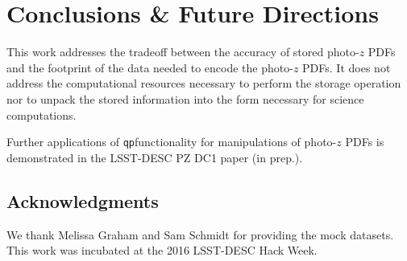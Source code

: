\documentclass[\docopts]{\docclass}
\newcommand{\qp}{\texttt{qp}}
\begin{document}

\section{Conclusions \& Future Directions}
\label{sec:conclusions}

%
%


This work addresses the tradeoff between the accuracy of stored photo-$z$ PDFs and the footprint of the data needed to encode the photo-$z$ PDFs.  It does not address the computational resources necessary to perform the storage operation nor to unpack the stored information into the form necessary for science computations.

Further applications of \qp functionality for manipulations of photo-$z$ PDFs is demonstrated in the LSST-DESC PZ DC1 paper (in prep.).

\subsection*{Acknowledgments}


We thank Melissa Graham and Sam Schmidt for providing the mock datasets.  This work was incubated at the 2016 LSST-DESC Hack Week.







%
\end{document}
